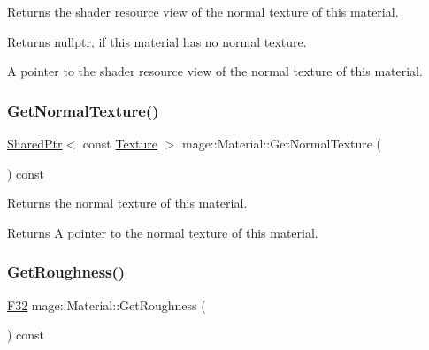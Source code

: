 Returns the shader resource view of the normal texture of this material.

\begin{DoxyReturn}{Returns}
{\ttfamily nullptr}, if this material has no normal texture. 

A pointer to the shader resource view of the normal texture of this material. 
\end{DoxyReturn}
\hypertarget{classmage_1_1_material_a41a286cf05a2627ee0baef602b01a1fb}{}\label{classmage_1_1_material_a41a286cf05a2627ee0baef602b01a1fb} 
\subsubsection{\texorpdfstring{Get\+Normal\+Texture()}{GetNormalTexture()}}
{\footnotesize\ttfamily \hyperlink{namespacemage_a1e01ae66713838a7a67d30e44c67703e}{Shared\+Ptr}$<$ const \hyperlink{classmage_1_1_texture}{Texture} $>$ mage\+::\+Material\+::\+Get\+Normal\+Texture (\begin{DoxyParamCaption}{ }\end{DoxyParamCaption}) const\hspace{0.3cm}{\ttfamily [noexcept]}}

Returns the normal texture of this material.

\begin{DoxyReturn}{Returns}
A pointer to the normal texture of this material. 
\end{DoxyReturn}
\hypertarget{classmage_1_1_material_a5b1a4e965f812e18594cf7455d49139c}{}\label{classmage_1_1_material_a5b1a4e965f812e18594cf7455d49139c} 
\subsubsection{\texorpdfstring{Get\+Roughness()}{GetRoughness()}}
{\footnotesize\ttfamily \hyperlink{namespacemage_aa97e833b45f06d60a0a9c4fc22ae02c0}{F32} mage\+::\+Material\+::\+Get\+Roughness (\begin{DoxyParamCaption}{ }\end{DoxyParamCaption}) const\hspace{0.3cm}{\ttfamily [noexcept]}}

